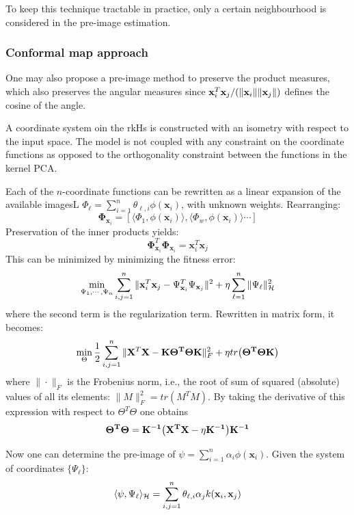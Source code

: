 \documentclass[12pt, letterpaper]{article}
\theoremstyle{definition}
\newcommand{\X}{\mathrm{\mathbf{X}}}
\newcommand{\x}{\mathbf{x}}
\DeclarePairedDelimiter\autobracket{(}{)}
\newcommand{\br}[1]{\autobracket*{#1}}
\begin{document}
To keep this technique tractable in practice, only a certain neighbourhood is considered in the pre-image estimation.
\subsubsection{Conformal map approach}
One may also propose a pre-image method to preserve the product measures, which also preserves the angular measures since  $\x_i^T \x_j/\br{\|\x_i\|\|\x_j\|}$ defines the cosine of the angle.

A coordinate system oin the rkHs is constructed with an isometry with respect to the input space. The model is not coupled with any constraint on the coordinate functions as opposed to the orthogonality constraint between the functions in the kernel PCA. 

Each of the $n$-coordinate functions can be rewritten as a linear expansion of the available imagesL $\Phi_\ell = \sum_{i=1}^n \theta_{\ell, i}\phi(\x_i)$, with unknown weights. Rearranging:
\begin{equation}
\mathbf{\Phi}_{\x_i} = \left[ \langle \Phi_1, \phi(\x_i)\rangle,  \langle \Phi_w, \phi(\x_i)\rangle \cdots\right]
\end{equation}
Preservation of the inner products yields:
\begin{equation}
\mathbf{\Phi}_{\x_i}^T\mathbf{\Phi}_{\x_i}= \x_i^T\x_j
\end{equation}
This can be minimized by minimizing the fitness error:
\begin{equation}
\min_{\Psi_1, \cdots, \Psi_n}{\sum_{i,j=1}^n \|\x_i^T\x_j - \Psi_{\x_i}^T\Psi_{\x_j}\|^2 + \eta \sum_{\ell=1}^n \|\Psi_\ell\|^2_{\CMcal{H}}}
\end{equation}
where the second term is the regularization term. Rewritten in matrix form, it becomes:
\begin{equation}
\min_{\Theta} \frac{1}{2}\sum_{i,j=1}^n \|\X^T\X - \mathbf{K\Theta^T\Theta K}\|^2_F + \eta tr\br{\mathbf{\Theta^T\Theta K}}
\end{equation}
where $\|\cdot\|_F$ is the Frobenius norm, i.e., the root of sum of squared (absolute) values of all its elements: $\|M\|^2_F=tr(M^TM)$. By taking the derivative of this expression with respect to $\Theta^T\Theta$ one obtains
\begin{equation}
\mathbf{\Theta^T\Theta = K^{-1}\br{X^TX-\eta K^{-1}}K^{-1}}
\end{equation}

Now one can determine the pre-image of $\psi = \sum_{i=1}^n\alpha_i \phi(\x_i)$. Given the system of coordinates $\{\Psi_\ell\}$:
\begin{equation}
\langle \psi, \Psi_\ell\rangle_\CMcal{H} = \sum_{i,j=1}^n \theta_{\ell,i}\alpha_j k(\x_i, \x_j)
\end{equation}
\end{document}
